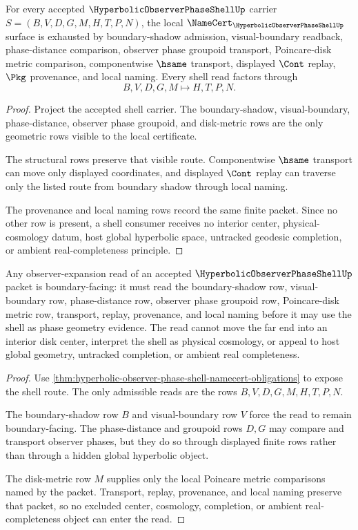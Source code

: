 \begin{theorem}
\label{thm:hyperbolic-observer-phase-shell-namecert-obligations}
For every accepted $\HyperbolicObserverPhaseShellUp$ carrier $S=(B,V,D,G,M,H,T,P,N)$, the local $\NameCert_{\HyperbolicObserverPhaseShellUp}$ surface is exhausted by boundary-shadow admission, visual-boundary readback, phase-distance comparison, observer phase groupoid transport, Poincare-disk metric comparison, componentwise $\hsame$ transport, displayed $\Cont$ replay, $\Pkg$ provenance, and local naming. Every shell read factors through
$$
B,V,D,G,M \longmapsto H,T,P,N .
$$
\end{theorem}
\begin{proof}
Project the accepted shell carrier. The boundary-shadow, visual-boundary, phase-distance, observer phase groupoid, and disk-metric rows are the only geometric rows visible to the local certificate.

The structural rows preserve that visible route. Componentwise $\hsame$ transport can move only displayed coordinates, and displayed $\Cont$ replay can traverse only the listed route from boundary shadow through local naming.

The provenance and local naming rows record the same finite packet. Since no other row is present, a shell consumer receives no interior center, physical-cosmology datum, host global hyperbolic space, untracked geodesic completion, or ambient real-completeness principle.
\end{proof}

\begin{theorem}
\label{thm:hyperbolic-observer-phase-shell-boundary-nonescape}
Any observer-expansion read of an accepted $\HyperbolicObserverPhaseShellUp$ packet is boundary-facing: it must read the boundary-shadow row, visual-boundary row, phase-distance row, observer phase groupoid row, Poincare-disk metric row, transport, replay, provenance, and local naming before it may use the shell as phase geometry evidence. The read cannot move the far end into an interior disk center, interpret the shell as physical cosmology, or appeal to host global geometry, untracked completion, or ambient real completeness.
\end{theorem}
\begin{proof}
Use \autoref{thm:hyperbolic-observer-phase-shell-namecert-obligations} to expose the shell route. The only admissible reads are the rows $B,V,D,G,M,H,T,P,N$.

The boundary-shadow row $B$ and visual-boundary row $V$ force the read to remain boundary-facing. The phase-distance and groupoid rows $D,G$ may compare and transport observer phases, but they do so through displayed finite rows rather than through a hidden global hyperbolic object.

The disk-metric row $M$ supplies only the local Poincare metric comparisons named by the packet. Transport, replay, provenance, and local naming preserve that packet, so no excluded center, cosmology, completion, or ambient real-completeness object can enter the read.
\end{proof}

